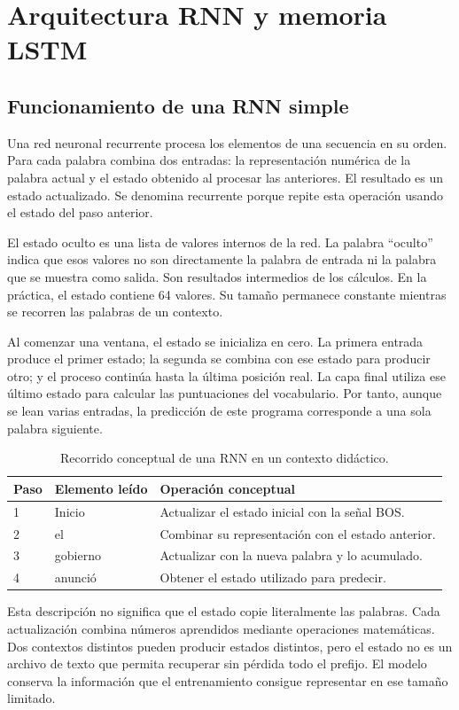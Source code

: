 \section{Arquitectura RNN y memoria LSTM}
\subsection{Funcionamiento de una RNN simple}
Una red neuronal recurrente procesa los elementos de una secuencia en su orden. Para cada palabra combina dos entradas: la representación numérica de la palabra actual y el estado obtenido al procesar las anteriores. El resultado es un estado actualizado. Se denomina recurrente porque repite esta operación usando el estado del paso anterior.

El estado oculto es una lista de valores internos de la red. La palabra ``oculto'' indica que esos valores no son directamente la palabra de entrada ni la palabra que se muestra como salida. Son resultados intermedios de los cálculos. En la práctica, el estado contiene 64 valores. Su tamaño permanece constante mientras se recorren las palabras de un contexto.

Al comenzar una ventana, el estado se inicializa en cero. La primera entrada produce el primer estado; la segunda se combina con ese estado para producir otro; y el proceso continúa hasta la última posición real. La capa final utiliza ese último estado para calcular las puntuaciones del vocabulario. Por tanto, aunque se lean varias entradas, la predicción de este programa corresponde a una sola palabra siguiente.

\begin{table}[tb]
\caption{Recorrido conceptual de una RNN en un contexto didáctico.}
\centering
\begin{tabular}{p{}p{}p{}}
\toprule Paso & Elemento leído & Operación conceptual\\\midrule
1 & Inicio & Actualizar el estado inicial con la señal BOS.\\
2 & el & Combinar su representación con el estado anterior.\\
3 & gobierno & Actualizar con la nueva palabra y lo acumulado.\\
4 & anunció & Obtener el estado utilizado para predecir.\\\bottomrule
\end{tabular}
\end{table}

Esta descripción no significa que el estado copie literalmente las palabras. Cada actualización combina números aprendidos mediante operaciones matemáticas. Dos contextos distintos pueden producir estados distintos, pero el estado no es un archivo de texto que permita recuperar sin pérdida todo el prefijo. El modelo conserva la información que el entrenamiento consigue representar en ese tamaño limitado.

